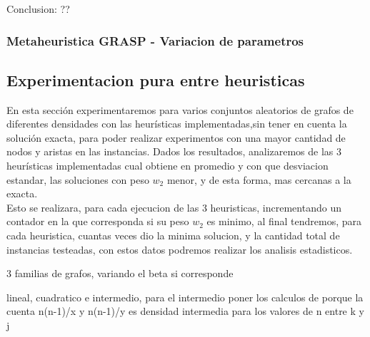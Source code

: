 Conclusion: ??









\subsubsection{Metaheuristica GRASP - Variacion de parametros}

\subsection{Experimentacion pura entre heuristicas}
En esta secci\'on experimentaremos para varios conjuntos aleatorios de grafos de diferentes densidades con las heur\'isticas implementadas,sin tener en cuenta la soluci\'on exacta, para poder realizar experimentos con una mayor cantidad de nodos y aristas en las instancias. Dados los resultados, analizaremos de las 3 heur\'isticas implementadas cual obtiene en promedio y con que desviacion estandar, las soluciones con peso $w_2$ menor, y de esta forma, mas cercanas a la exacta.\\

Esto se realizara, para cada ejecucion de las 3 heuristicas, incrementando un contador en la que corresponda si su peso $w_2$ es minimo, al final tendremos, para cada heuristica, cuantas veces dio la minima solucion, y la cantidad total de instancias testeadas, con estos datos podremos realizar los analisis estadisticos.



3 familias de grafos, variando el beta si corresponde

lineal, cuadratico e intermedio, para el intermedio poner 
los calculos de porque la cuenta n(n-1)/x y n(n-1)/y es densidad intermedia para los valores de n entre k y j